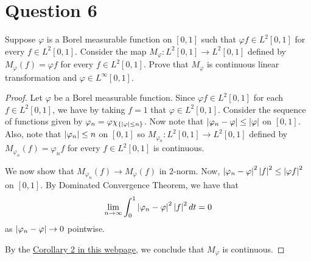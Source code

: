 \section{Question 6}
\horz
Suppose $\varphi $ is a Borel measurable function on $[0,1]$ such that $\varphi f \in L^2[0,1]$ for every $f\in L^2[0,1].$ Consider the map $M_{\varphi} : L^2[0,1] \to L^2[0,1]$ defined by $M_{\varphi}(f) = \varphi f$ for every $f\in L^2[0,1].$ Prove that $M_{\varphi}$ is continuous linear transformation and $\varphi \in L^{\infty}[0,1].$ 
\horz
\begin{proof}
    Let $\varphi$ be a Borel measurable function. Since $\varphi f \in L^{2} [0,1]$ for each $f\in L^2 [0,1]$, we have by taking $f=1$ that $\varphi \in L^{2} [0,1]$. Consider the sequence of functions given by $\varphi_{n } = \varphi \chi_{\left\{ \left\lvert \varphi  \right\rvert \le n \right\}}$. Now note that $|\varphi_{n}-\varphi| \le \left\lvert \varphi \right\rvert$ on $[0,1]$. Also, note that $\left\lvert \varphi_{n} \right\rvert \le n$ on $[0,1]$ so $M_{\varphi_{n}} : L^{2} [0,1] \to L^{2} [0,1]$ defined by $M_{\varphi_{n}} (f) = \varphi_{n} f$ for every $f\in L^{2} [0,1]$ is continuous.

    We now show that $M_{\varphi_{n}}(f) \to M_{\varphi} \left( f \right)$ in $2$-norm. Now, $\left\lvert \varphi_{n} -\varphi \right\rvert^{2} \left\lvert f \right\rvert^{2} \le \left\lvert \varphi f \right\rvert^{2}$ on $[0,1]$. By Dominated Convergence Theorem, we have that 
    \begin{equation*}
	\lim_{n\to \infty} \int_{0}^{1} \left\lvert \varphi_{n} -\varphi \right\rvert^{2} \left\lvert f \right\rvert^{2} dt = 0
    \end{equation*}
    as $\left\lvert \varphi_{n} - \varphi  \right\rvert \to 0$ pointwise.

    By the \href{http://mathonline.wikidot.com/corollaries-to-the-uniform-boundedness-principle}{Corollary 2 in this webpage}, we conclude that $M_{\varphi}$ is continuous.
\end{proof}

